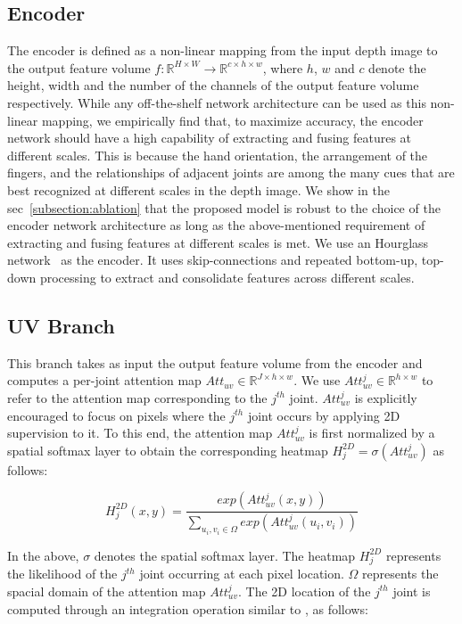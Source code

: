 \documentclass{article}
\begin{document}
\subsection{Encoder} \label{subsection:encoder}
The encoder is defined as a non-linear mapping from the input depth image to the output feature volume $f: {\mathbb{R}^{H\times{W}}}\rightarrow {\mathbb{R}^{c\times{h\times{w}}}}$, where $h$, $w$ and $c$ denote the height, width and the number of the channels of the output feature volume respectively. While any off-the-shelf network architecture can be used as this non-linear mapping, we empirically find that, to maximize accuracy, the encoder network should have a high capability of extracting and fusing features at different scales. This is because the hand orientation, the arrangement of the fingers, and the relationships of adjacent joints are among the many cues that are best recognized at different scales in the depth image. We show in the sec~\ref{subsection:ablation} that the proposed model is robust to the choice of the encoder network architecture as long as the above-mentioned requirement of extracting and fusing features at different scales is met. We use an Hourglass network~\cite{newell2016stacked} as the encoder. It uses skip-connections and repeated bottom-up, top-down processing to extract and consolidate features across different scales. 

\subsection{UV Branch}
This branch takes as input the output feature volume from the encoder and computes a per-joint attention map $Att_{uv} \in{ \mathbb{R}^{J\times{h\times{w}}} }$. We use $Att_{uv}^j \in{ \mathbb{R}^{h\times{w}} }$ to refer to the attention map corresponding to the $j^{th}$ joint. $Att_{uv}^j$ is explicitly encouraged to focus on pixels where the $j^{th}$ joint occurs by applying 2D supervision to it. To this end, the attention map $Att_{uv}^j$ is first normalized by a spatial softmax layer \cite{iqbal2018hand} to obtain the corresponding heatmap ${H}_j^{2D} = \sigma(Att_{uv}^j)$ as follows:

\begin{equation}
  {H}_j^{2D}(x,y) =\frac{exp(Att_{uv}^j(x,y))}{\sum\limits_{u_i,v_i\in{\Omega}}exp(Att_{uv}^j(u_i,v_i))}
\end{equation}

In the above, $\sigma$ denotes the spatial softmax layer. The heatmap $H_j^{2D}$ represents the likelihood of the $j^{th}$ joint occurring at each pixel location. $\Omega$ represents the spacial domain of the attention map $Att_{uv}^j$. The 2D location of the $j^{th}$ joint is computed through an integration operation similar to \cite{sun2018integral,iqbal2018hand}, as follows: 
\end{document}

